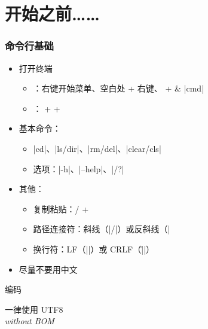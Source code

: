 \section{开始之前……}

\begin{frame}[fragile]
\frametitle{命令行基础}
\begin{itemize}
  \item 打开终端
    \begin{itemize}
      \item \faWindows{}：右键开始菜单、空白处 \kbdShift{} + 右键、\kbdWin{} +  \& |cmd|
      \item \faLinux{}：\kbdCtrl{} + \kbdAlt{} + 
    \end{itemize}
  \item 基本命令：
    \begin{itemize}
      \item |cd|、|ls/dir|、|rm/del|、|clear/cls|
      \item 选项：|-h|、|--help|、|/?|
    \end{itemize}
  \item 其他：
    \begin{itemize}
      \item 复制粘贴：\kbdCtrl{}/\kbdShift{} + \kbdIns{}
      \item 路径连接符：斜线（|/|）或反斜线（|\|）
      \item 换行符：LF（|\n|）或 CRLF（|\r\n|）
    \end{itemize}
  \item \alert{尽量不要用中文}
\end{itemize}
\end{frame}

\begin{frame}{编码}
\begin{center}
  \huge \alert{一律使用 UTF\CASE{-}8} \\[0.5ex]
  \footnotesize \textit{without BOM}
\end{center}
\end{frame}

